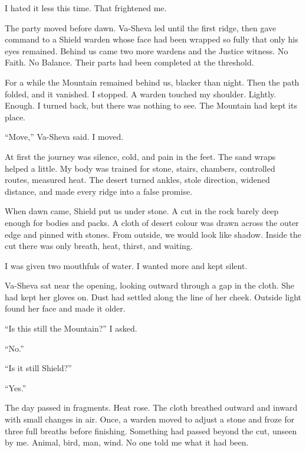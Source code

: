 I hated it less this time. That frightened me.\par

The party moved before dawn. Va-Sheva led until the first ridge, then gave command to a Shield warden whose face had been wrapped so fully that only his eyes remained. Behind us came two more wardens and the Justice witness. No Faith. No Balance. Their parts had been completed at the threshold.\par

For a while the Mountain remained behind us, blacker than night. Then the path folded, and it vanished. I stopped. A warden touched my shoulder. Lightly. Enough. I turned back, but there was nothing to see. The Mountain had kept its place.\par

``Move,'' Va-Sheva said. I moved.\par

At first the journey was silence, cold, and pain in the feet. The sand wraps helped a little. My body was trained for stone, stairs, chambers, controlled routes, measured heat. The desert turned ankles, stole direction, widened distance, and made every ridge into a false promise.\par

When dawn came, Shield put us under stone. A cut in the rock barely deep enough for bodies and packs. A cloth of desert colour was drawn across the outer edge and pinned with stones. From outside, we would look like shadow. Inside the cut there was only breath, heat, thirst, and waiting.\par

I was given two mouthfuls of water. I wanted more and kept silent.\par

Va-Sheva sat near the opening, looking outward through a gap in the cloth. She had kept her gloves on. Dust had settled along the line of her cheek. Outside light found her face and made it older.\par

``Is this still the Mountain?'' I asked.\par

``No.''\par

``Is it still Shield?''\par

``Yes.''\par

The day passed in fragments. Heat rose. The cloth breathed outward and inward with small changes in air. Once, a warden moved to adjust a stone and froze for three full breaths before finishing. Something had passed beyond the cut, unseen by me. Animal, bird, man, wind. No one told me what it had been.\par

